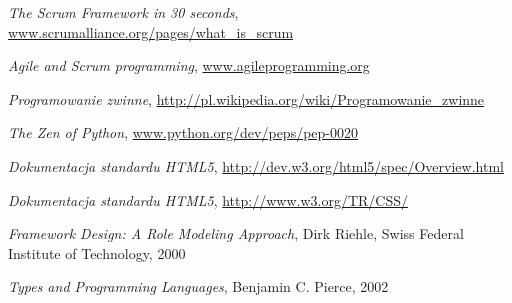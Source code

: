 \begin{thebibliography}{99}

   \emph{The Scrum Framework in 30 seconds}, \url{www.scrumalliance.org/pages/what_is_scrum}

   \emph{Agile and Scrum programming}, \url{www.agileprogramming.org}

   \emph{Programowanie zwinne}, \url{http://pl.wikipedia.org/wiki/Programowanie_zwinne}

   \emph{The Zen of Python}, \url{www.python.org/dev/peps/pep-0020}

   \emph{Dokumentacja standardu HTML5}, \url{http://dev.w3.org/html5/spec/Overview.html}

   \emph{Dokumentacja standardu HTML5}, \url{http://www.w3.org/TR/CSS/}

   \emph{Framework Design: A Role Modeling Approach}, Dirk Riehle, Swiss Federal Institute of Technology, 2000

   \emph{Types and Programming Languages}, Benjamin C. Pierce, 2002

\end{thebibliography}

